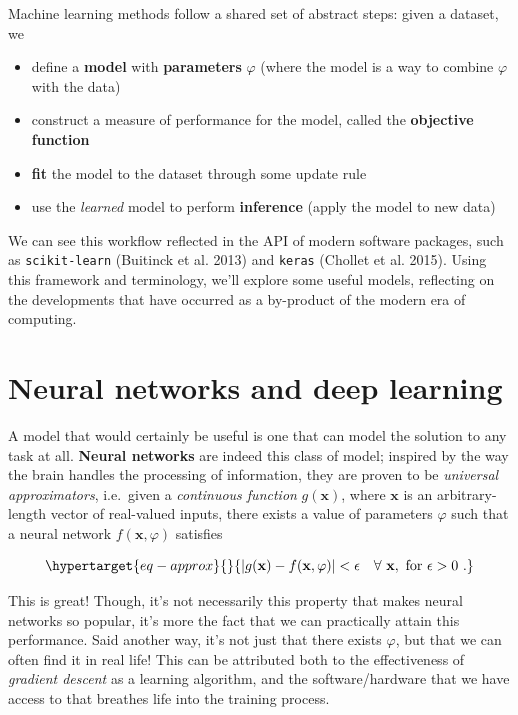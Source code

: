 \documentclass[
  11pt,
  numbers=noendperiod]{book}
\providecommand{\tightlist}{%
  \setlength{\itemsep}{0pt}\setlength{\parskip}{0pt}}\usepackage{longtable,booktabs,array}
\begin{document}
Machine learning methods follow a shared set of abstract steps: given a
dataset, we

\begin{itemize}
\tightlist
\item
  define a \textbf{model} with \textbf{parameters} \(\varphi\) (where
  the model is a way to combine \(\varphi\) with the data)
\item
  construct a measure of performance for the model, called the
  \textbf{objective function}
\item
  \textbf{fit} the model to the dataset through some update rule
\item
  use the \emph{learned} model to perform \textbf{inference} (apply the
  model to new data)
\end{itemize}

We can see this workflow reflected in the API of modern software
packages, such as \texttt{scikit-learn} (Buitinck et al. 2013) and
\texttt{keras} (Chollet et al. 2015). Using this framework and
terminology, we'll explore some useful models, reflecting on the
developments that have occurred as a by-product of the modern era of
computing.

\hypertarget{neural-networks-and-deep-learning}{%
\section{Neural networks and deep
learning}\label{neural-networks-and-deep-learning}}

A model that would certainly be useful is one that can model the
solution to any task at all. \textbf{Neural networks} are indeed this
class of model; inspired by the way the brain handles the processing of
information, they are proven to be \emph{universal approximators},
i.e.~given a \emph{continuous function} \(g(\mathbf{x})\), where
\(\mathbf{x}\) is an arbitrary-length vector of real-valued inputs,
there exists a value of parameters \(\varphi\) such that a neural
network \(f(\mathbf{x}, \varphi)\) satisfies

\begin{equation}\protect\hypertarget{eq-approx}{}{
|g(\mathbf{x}) - f(\mathbf{x}, \varphi)| < \epsilon~~~\forall~\mathbf{x},~\text{for }\epsilon>0~.
}\label{eq-approx}\end{equation}

This is great! Though, it's not necessarily this property that makes
neural networks so popular, it's more the fact that we can practically
attain this performance. Said another way, it's not just that there
exists \(\varphi\), but that we can often find it in real life! This can
be attributed both to the effectiveness of \emph{gradient descent} as a
learning algorithm, and the software/hardware that we have access to
that breathes life into the training process.
\end{document}
